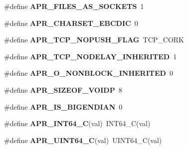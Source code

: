 \begin{DoxyCompactItemize}
\item 
\#define {\bfseries A\+P\+R\+\_\+\+F\+I\+L\+E\+S\+\_\+\+A\+S\+\_\+\+S\+O\+C\+K\+E\+TS}~1\hypertarget{group__apr__platform_gace899f1ccb69c00ae7c65212ca5890b1}{}\label{group__apr__platform_gace899f1ccb69c00ae7c65212ca5890b1}

\item 
\#define {\bfseries A\+P\+R\+\_\+\+C\+H\+A\+R\+S\+E\+T\+\_\+\+E\+B\+C\+D\+IC}~0\hypertarget{group__apr__platform_ga8c71221bae49df0b88a0f725e96c681f}{}\label{group__apr__platform_ga8c71221bae49df0b88a0f725e96c681f}

\item 
\#define {\bfseries A\+P\+R\+\_\+\+T\+C\+P\+\_\+\+N\+O\+P\+U\+S\+H\+\_\+\+F\+L\+AG}~T\+C\+P\+\_\+\+C\+O\+RK\hypertarget{group__apr__platform_ga6e74a453e90a6495a981f5f312ec6beb}{}\label{group__apr__platform_ga6e74a453e90a6495a981f5f312ec6beb}

\item 
\#define {\bfseries A\+P\+R\+\_\+\+T\+C\+P\+\_\+\+N\+O\+D\+E\+L\+A\+Y\+\_\+\+I\+N\+H\+E\+R\+I\+T\+ED}~1\hypertarget{group__apr__platform_ga22df092ebdce7f9f8c6611d974a4ae82}{}\label{group__apr__platform_ga22df092ebdce7f9f8c6611d974a4ae82}

\item 
\#define {\bfseries A\+P\+R\+\_\+\+O\+\_\+\+N\+O\+N\+B\+L\+O\+C\+K\+\_\+\+I\+N\+H\+E\+R\+I\+T\+ED}~0\hypertarget{group__apr__platform_gac6a178e9f749311c8f3a98da3dfd321d}{}\label{group__apr__platform_gac6a178e9f749311c8f3a98da3dfd321d}

\item 
\#define {\bfseries A\+P\+R\+\_\+\+S\+I\+Z\+E\+O\+F\+\_\+\+V\+O\+I\+DP}~8\hypertarget{group__apr__platform_gaa7a2a1de7949f09e29edae60b0d4c27f}{}\label{group__apr__platform_gaa7a2a1de7949f09e29edae60b0d4c27f}

\item 
\#define {\bfseries A\+P\+R\+\_\+\+I\+S\+\_\+\+B\+I\+G\+E\+N\+D\+I\+AN}~0\hypertarget{group__apr__platform_gabf5174c5d522e1a149cbb38a4310743f}{}\label{group__apr__platform_gabf5174c5d522e1a149cbb38a4310743f}

\item 
\#define {\bfseries A\+P\+R\+\_\+\+I\+N\+T64\+\_\+C}(val)~I\+N\+T64\+\_\+C(val)\hypertarget{group__apr__platform_gaae749817bb595cd5dcb9c17c119ddb13}{}\label{group__apr__platform_gaae749817bb595cd5dcb9c17c119ddb13}

\item 
\#define {\bfseries A\+P\+R\+\_\+\+U\+I\+N\+T64\+\_\+C}(val)~U\+I\+N\+T64\+\_\+C(val)\hypertarget{group__apr__platform_gaede133b7384b6a7a08c51cf1fa9c4001}{}\label{group__apr__platform_gaede133b7384b6a7a08c51cf1fa9c4001}


\end{DoxyCompactItemize}
